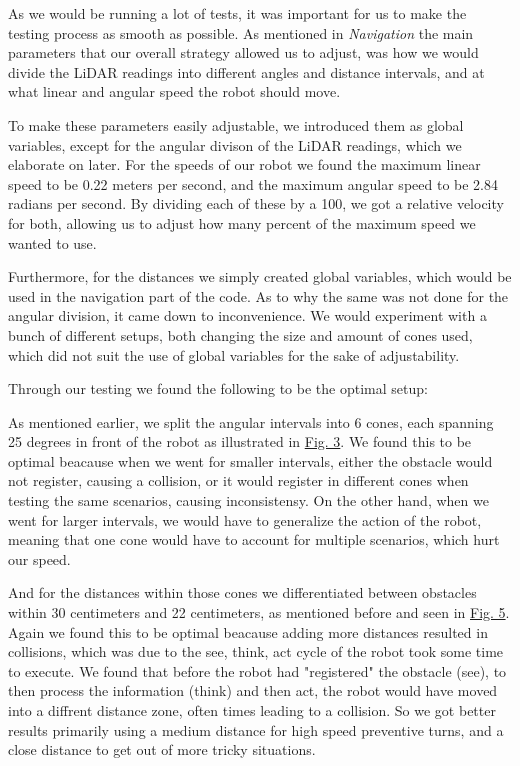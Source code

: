 \documentclass[conference]{IEEEtran}
\begin{document}
As we would be running a lot of tests, it was important for us to make the testing process as smooth as possible.
As mentioned in \textit{Navigation} the main parameters that our overall strategy allowed us to adjust, was how we would divide the LiDAR readings into different angles and distance intervals, and at what linear and angular speed the robot should move.

To make these parameters easily adjustable, we introduced them as global variables, except for the angular divison of the LiDAR readings, which we elaborate on later.
For the speeds of our robot we found the maximum linear speed to be 0.22 meters per second, and the maximum angular speed to be 2.84 radians per second.
By dividing each of these by a 100, we got a relative velocity for both, allowing us to adjust how many percent of the maximum speed we wanted to use.

Furthermore, for the distances we simply created global variables, which would be used in the navigation part of the code.
As to why the same was not done for the angular division, it came down to inconvenience.
We would experiment with a bunch of different setups, both changing the size and amount of cones used, which did not suit the use of global variables for the sake of adjustability.

Through our testing we found the following to be the optimal setup:

As mentioned earlier, we split the angular intervals into 6 cones, each spanning 25 degrees in front of the robot as illustrated in \href{sec:angles}{Fig. 3}.
We found this to be optimal beacause when we went for smaller intervals, either the obstacle would not register, causing a collision, or it would register in different cones when testing the same scenarios, causing inconsistensy.
On the other hand, when we went for larger intervals, we would have to generalize the action of the robot, meaning that one cone would have to account for multiple scenarios, which hurt our speed.

And for the distances within those cones we differentiated between obstacles within 30 centimeters and 22 centimeters, as mentioned before and seen in \href{sec:distances}{Fig. 5}.
Again we found this to be optimal beacause adding more distances resulted in collisions, which was due to the see, think, act cycle of the robot took some time to execute.
We found that before the robot had "registered" the obstacle (see), to then process the information (think) and then act, the robot would have moved into a diffrent distance zone, often times leading to a collision.
So we got better results primarily using a medium distance for high speed preventive turns, and a close distance to get out of more tricky situations.
\end{document}
